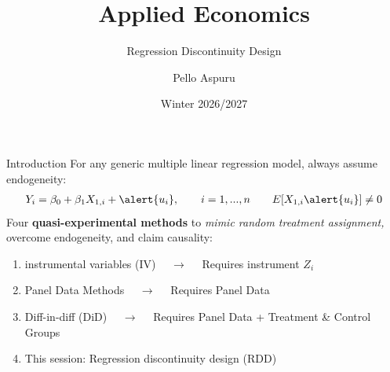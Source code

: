 \documentclass[9pt,aspectratio=169, xcolor=dvipsnames]{beamer}
\title{Applied Economics}
\subtitle{Regression Discontinuity Design}
\author{Pello Aspuru}
\date{Winter 2026/2027}
\begin{document}
%
	
{
  \begin{frame}
    \titlepage
  \end{frame}
}
	

\begin{frame}{Introduction}
For any generic multiple linear regression model, always assume endogeneity:
\begin{align*}
       Y_{i} = \beta_0 + \beta_1 X_{1,i} + \alert{u_{i}}, \quad \quad i = 1, ... , n
	   \quad \quad E[X_{1,i} \alert{u_{i}}] \neq 0 
\end{align*}    
\pause
Four \color{teal}\textbf{quasi-experimental methods} \color{black}to \textit{mimic random treatment assignment,} overcome endogeneity, and claim \alert{causality}: 
\begin{enumerate}
    \item instrumental variables (IV) $\quad \rightarrow \quad$ Requires instrument $Z_{i}$
    \item Panel Data Methods $\quad \rightarrow \quad$ Requires Panel Data
    \item Diff-in-diff (DiD) $\quad \rightarrow \quad$ Requires Panel Data + Treatment \& Control Groups
    \item This session: \alert{Regression discontinuity design (RDD)}
\end{enumerate}

\pause

\end{frame}
	
\end{document}
